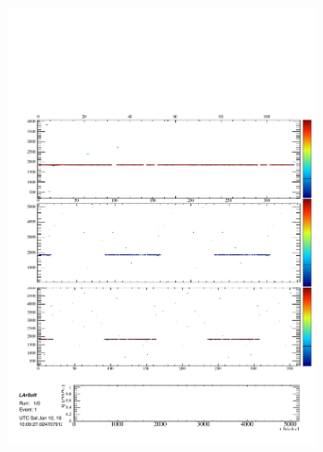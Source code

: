 \begin{figure}
  \begin{subfigure}[t]{\linewidth}
    \centering
    \begin{minipage}{0.48\textwidth}
      \centering
      \includegraphics[width=\textwidth]{SimulatedMuon.pdf}
    \end{minipage}
    \begin{minipage}{0.48\textwidth}
      \centering

\end{minipage}
\end{subfigure}
\end{figure}
